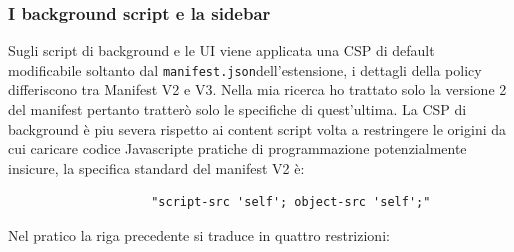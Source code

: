 \documentclass{sapthesis}
\newcommand{\code}[1]{\texttt{#1}}
\newcommand{\JS}{Javascript}
\newcommand{\manifest}{\code{manifest.json}}
\begin{document}
            \subsubsection{I background script e la sidebar}
            \label{sec:difese-background-sidebar}
                Sugli script di background e le UI viene applicata una CSP di default modificabile soltanto dal
                \manifest dell'estensione, i dettagli della policy differiscono tra Manifest V2 e V3. Nella
                mia ricerca ho trattato solo la versione 2 del manifest pertanto tratterò solo le specifiche
                di quest'ultima.
                La CSP di background è piu severa rispetto ai content script volta a restringere le origini
                da cui caricare codice \JS e pratiche di programmazione potenzialmente insicure, la specifica
                standard del manifest V2 è:
                \begin{lstlisting}
                    "script-src 'self'; object-src 'self';"
                \end{lstlisting}
                Nel pratico la riga precedente si traduce in quattro restrizioni:
\end{document}
